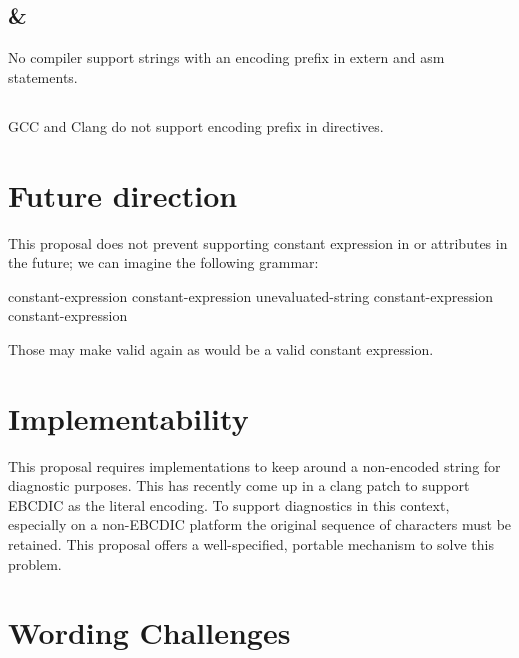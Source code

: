 \documentclass{wg21}
\begin{document}
\subsection{ \& }

No compiler support strings with an encoding prefix in extern and asm statements.

\subsection{}

GCC and  Clang do not support encoding prefix in  directives.

\section{Future direction}

This proposal does not prevent supporting constant expression in  or attributes in
the future; we can imagine the following grammar:

\begin{bnf}
    \br
     \terminal{(} constant-expression \terminal{)} \terminal{;}\br
     \terminal{(} constant-expression \terminal{,} unevaluated-string \terminal{)} \terminal{;}\br
     \terminal{(} constant-expression \terminal{,} constant-expression \terminal{)} \terminal{;}
\end{bnf}

Those may make  valid again as  would be a valid constant expression.


\section{Implementability}

This proposal requires implementations to keep around a non-encoded string for diagnostic purposes.
This has recently come up in a clang patch to support EBCDIC as the literal encoding.
To support diagnostics in this context, especially on a non-EBCDIC platform the original sequence of characters must be retained.
This proposal offers a well-specified, portable mechanism to solve this problem.

\section{Wording Challenges}
\end{document}
